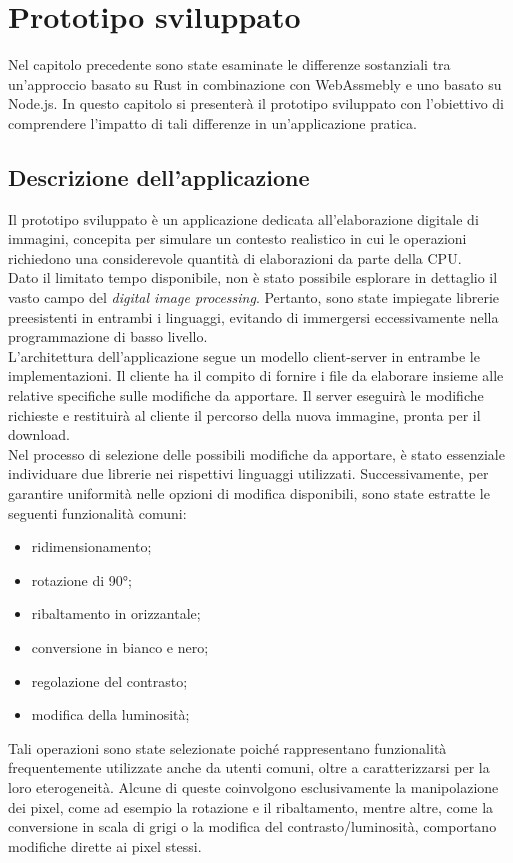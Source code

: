\chapter{Prototipo sviluppato}
\label{chap:3}
Nel capitolo precedente sono state esaminate le differenze sostanziali tra un'approccio basato su Rust in combinazione con WebAssmebly e uno basato su Node.js.
In questo capitolo si presenterà il prototipo sviluppato con l'obiettivo di comprendere l'impatto di tali differenze in un'applicazione pratica.
\section{Descrizione dell'applicazione}
Il prototipo sviluppato è un applicazione dedicata all'elaborazione digitale di immagini, concepita per simulare un contesto realistico in cui le operazioni richiedono una considerevole quantità di elaborazioni da parte della CPU.
\\Dato il limitato tempo disponibile, non è stato possibile esplorare in dettaglio il vasto campo del \emph{digital image processing}. Pertanto, sono state impiegate librerie preesistenti in entrambi i linguaggi, evitando di immergersi eccessivamente nella programmazione di basso livello.
\\L'architettura dell'applicazione segue un modello client-server in entrambe le implementazioni.
Il cliente ha il compito di fornire i file da elaborare insieme alle relative specifiche sulle modifiche da apportare.
Il server eseguirà le modifiche richieste e restituirà al cliente il percorso della nuova immagine, pronta per il download.
\\Nel processo di selezione delle possibili modifiche da apportare, è stato essenziale individuare due librerie nei rispettivi linguaggi utilizzati.
Successivamente, per garantire uniformità nelle opzioni di modifica disponibili, sono state estratte le seguenti funzionalità comuni: 
\begin{itemize}
    \item ridimensionamento;
    \item rotazione di 90°;
    \item ribaltamento in orizzantale;
    \item conversione in bianco e nero;
    \item regolazione del contrasto;
    \item modifica della luminosità;
\end{itemize}
Tali operazioni sono state selezionate poiché rappresentano funzionalità frequentemente utilizzate anche da utenti comuni, oltre a caratterizzarsi per la loro eterogeneità. Alcune di queste coinvolgono esclusivamente la manipolazione dei pixel, come ad esempio la rotazione e il ribaltamento, mentre altre, come la conversione in scala di grigi o la modifica del contrasto/luminosità, comportano modifiche dirette ai pixel stessi.
